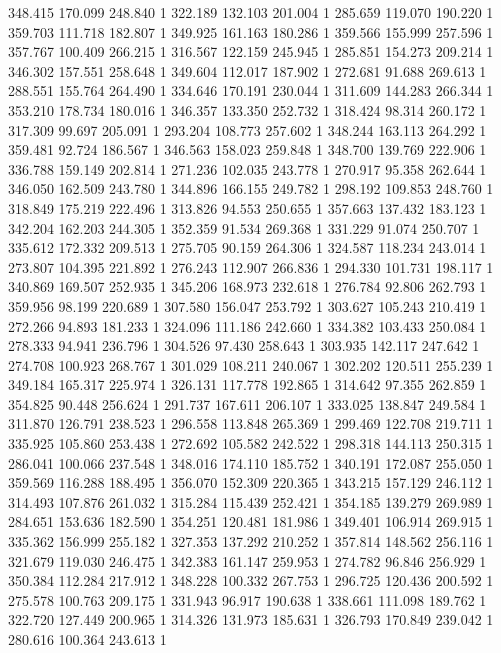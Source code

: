 	348.415	170.099	248.840	1
	322.189	132.103	201.004	1
	285.659	119.070	190.220	1
	359.703	111.718	182.807	1
	349.925	161.163	180.286	1
	359.566	155.999	257.596	1
	357.767	100.409	266.215	1
	316.567	122.159	245.945	1
	285.851	154.273	209.214	1
	346.302	157.551	258.648	1
	349.604	112.017	187.902	1
	272.681	91.688	269.613	1
	288.551	155.764	264.490	1
	334.646	170.191	230.044	1
	311.609	144.283	266.344	1
	353.210	178.734	180.016	1
	346.357	133.350	252.732	1
	318.424	98.314	260.172	1
	317.309	99.697	205.091	1
	293.204	108.773	257.602	1
	348.244	163.113	264.292	1
	359.481	92.724	186.567	1
	346.563	158.023	259.848	1
	348.700	139.769	222.906	1
	336.788	159.149	202.814	1
	271.236	102.035	243.778	1
	270.917	95.358	262.644	1
	346.050	162.509	243.780	1
	344.896	166.155	249.782	1
	298.192	109.853	248.760	1
	318.849	175.219	222.496	1
	313.826	94.553	250.655	1
	357.663	137.432	183.123	1
	342.204	162.203	244.305	1
	352.359	91.534	269.368	1
	331.229	91.074	250.707	1
	335.612	172.332	209.513	1
	275.705	90.159	264.306	1
	324.587	118.234	243.014	1
	273.807	104.395	221.892	1
	276.243	112.907	266.836	1
	294.330	101.731	198.117	1
	340.869	169.507	252.935	1
	345.206	168.973	232.618	1
	276.784	92.806	262.793	1
	359.956	98.199	220.689	1
	307.580	156.047	253.792	1
	303.627	105.243	210.419	1
	272.266	94.893	181.233	1
	324.096	111.186	242.660	1
	334.382	103.433	250.084	1
	278.333	94.941	236.796	1
	304.526	97.430	258.643	1
	303.935	142.117	247.642	1
	274.708	100.923	268.767	1
	301.029	108.211	240.067	1
	302.202	120.511	255.239	1
	349.184	165.317	225.974	1
	326.131	117.778	192.865	1
	314.642	97.355	262.859	1
	354.825	90.448	256.624	1
	291.737	167.611	206.107	1
	333.025	138.847	249.584	1
	311.870	126.791	238.523	1
	296.558	113.848	265.369	1
	299.469	122.708	219.711	1
	335.925	105.860	253.438	1
	272.692	105.582	242.522	1
	298.318	144.113	250.315	1
	286.041	100.066	237.548	1
	348.016	174.110	185.752	1
	340.191	172.087	255.050	1
	359.569	116.288	188.495	1
	356.070	152.309	220.365	1
	343.215	157.129	246.112	1
	314.493	107.876	261.032	1
	315.284	115.439	252.421	1
	354.185	139.279	269.989	1
	284.651	153.636	182.590	1
	354.251	120.481	181.986	1
	349.401	106.914	269.915	1
	335.362	156.999	255.182	1
	327.353	137.292	210.252	1
	357.814	148.562	256.116	1
	321.679	119.030	246.475	1
	342.383	161.147	259.953	1
	274.782	96.846	256.929	1
	350.384	112.284	217.912	1
	348.228	100.332	267.753	1
	296.725	120.436	200.592	1
	275.578	100.763	209.175	1
	331.943	96.917	190.638	1
	338.661	111.098	189.762	1
	322.720	127.449	200.965	1
	314.326	131.973	185.631	1
	326.793	170.849	239.042	1
	280.616	100.364	243.613	1
